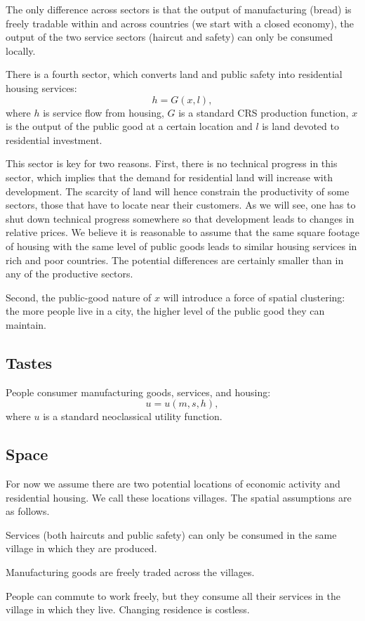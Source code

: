 \documentclass[12pt]{article}
\begin{document}
The only difference across sectors is that the output of manufacturing (bread) is freely tradable within and across countries (we start with a closed economy), the output of the two service sectors (haircut and safety) can only be consumed locally.

There is a fourth sector, which converts land and public safety into residential housing services:
\[
h = G(x,l),
\]
where $h$ is service flow from housing, $G$ is a standard CRS production function, $x$ is the output of the public good at a certain location and $l$ is land devoted to residential investment. 

This sector is key for two reasons. First, there is no technical progress in this sector, which implies that the demand for residential land will increase with development. The scarcity of land will hence constrain the productivity of some sectors, those that have to locate near their customers. As we will see, one has to shut down technical progress somewhere so that development leads to changes in relative prices. We believe it is reasonable to assume that the same square footage of housing with the same level of public goods leads to similar housing services in rich and poor countries. The potential differences are certainly smaller than in any of the productive sectors.

Second, the public-good nature of $x$ will introduce a force of spatial clustering: the more people live in a city, the higher level of the public good they can maintain.
\subsection{Tastes}
People consumer manufacturing goods, services, and housing:
\[
u = u(m,s,h),
\]
where $u$ is a standard neoclassical utility function.
\subsection{Space}
For now we assume there are two potential locations of economic activity and residential housing. We call these locations villages. The spatial assumptions are as follows.

Services (both haircuts and public safety) can only be consumed in the same village in which they are produced.

Manufacturing goods are freely traded across the villages.

People can commute to work freely, but they consume all their services in the village in which they live. Changing residence is costless.
\end{document}
